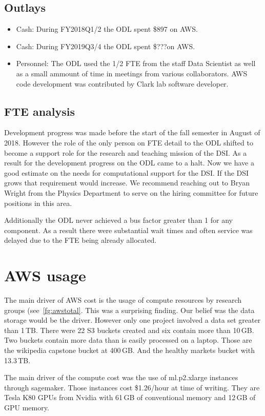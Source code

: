 \subsection{Outlays}
\begin{itemize}
\item Cash: During FY2018Q1/2 the ODL spent \$897 on AWS.
\item Cash: During FY2019Q3/4 the ODL spent \$???on AWS.
\item Personnel: The ODL used the 1/2 FTE from the staff Data Scientist as well as a small ammount of time in meetings from various collaborators. AWS code development was contributed by Clark lab software developer.
\end{itemize}


\subsection{FTE analysis}
Development progress was made before the start of the fall semester in August of 2018. However the role of the only person on FTE detail to the ODL shifted to become a support role for the research and teaching mission of the DSI. As a result for the development progress on the ODL came to a halt. Now we have a good estimate on the needs for computational support for the DSI. If the DSI grows that requirement would increase. We recommend reaching out to Bryan Wright from the Physics Department to serve on the hiring committee for future positions in this area.

Additionally the ODL never achieved a bus factor greater than 1 for any component. As a result there were substantial wait times and often service was delayed due to the FTE being already allocated.

\section{AWS usage}
The main driver of AWS cost is the usage of compute resources by research groups (see~\ref{fg:awstotal}. This was a surprising finding. Our belief was the data storage would be the driver. However only one project involved a data set greater than 1\,TB.
There were 22 S3 buckets created and six contain more than 10\,GB. Two buckets contain more data than is easily processed on a laptop. Those are the wikipedia capstone bucket at 400\,GB. And the healthy markets bucket with 13.3\,TB.

The main driver of the compute cost was the use of ml.p2.xlarge instances through sagemaker. Those instances cost \$1.26/hour at time of writing. They are Tesla K80 GPUs from Nvidia with 61\,GB of conventional memory and 12\,GB of GPU memory.


